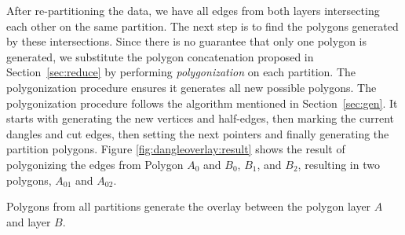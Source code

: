After re-partitioning the data, we have all edges from both layers intersecting each other on the same partition. The next step is to find the polygons generated by these intersections. Since there is no guarantee that only one polygon is generated, we substitute the polygon concatenation proposed in Section~\ref{sec:reduce} by performing \textit{polygonization} on each partition. The polygonization procedure ensures it generates all new possible polygons. The polygonization procedure follows the algorithm mentioned in Section~\ref{sec:gen}. It starts with generating the new vertices and half-edges, then marking the current dangles and cut edges, then setting the next pointers and finally generating the partition polygons.
Figure \ref{fig:dangleoverlay:result} shows the result of polygonizing the edges from Polygon $A_0$ and $B_0$, $B_1$, and $B_2$, resulting in two polygons, $A_01$ and $A_02$.

Polygons from all partitions generate the overlay between the polygon layer $A$ and layer $B$.